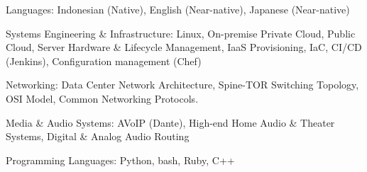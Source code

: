 

\begin{cvparagraph}

\begin{cvbullets}
    \item Languages: Indonesian (Native), English (Near-native), Japanese (Near-native)
    \item Systems Engineering \& Infrastructure: Linux, On-premise Private Cloud, Public Cloud, Server Hardware \& Lifecycle Management, IaaS Provisioning, IaC, CI/CD (Jenkins), Configuration management (Chef)
    \item Networking: Data Center Network Architecture, Spine-TOR Switching Topology, OSI Model, Common Networking Protocols.
    \item Media \& Audio Systems: AVoIP (Dante), High-end Home Audio \& Theater Systems, Digital \& Analog Audio Routing
    \item Programming Languages:  Python, bash, Ruby, C++
\end{cvbullets}
\end{cvparagraph}
